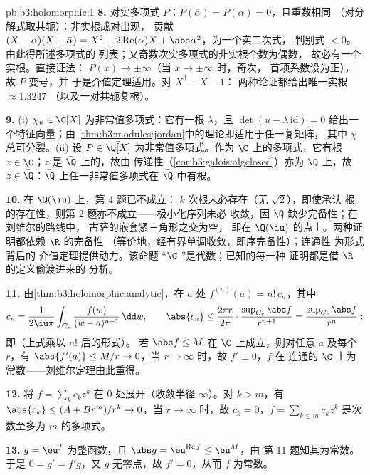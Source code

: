 \begin{solution}{pb:b3:holomorphic:1}
\textbf{8.} 对实多项式 $P$：$P(\bar\alpha) =
\overline{P(\alpha)} = 0$，且重数相同
（对分解式取共轭）：非实根成对出现，
贡献 $(X - \alpha)(X - \bar\alpha) = X^2 -
2\operatorname{Re}(\alpha)X + \abs\alpha^2$，为一个实二次式，
判别式 $< 0$。由此得所述多项式的
列表；又奇数次实多项式的非实根个数为偶数，
故必有一个实根。直接证法：
$P(x) \to \pm\infty$（当 $x \to \pm\infty$ 时，奇次，
首项系数设为正），故 $P$ 变号，并
于是介值定理适用。对 $X^3 - X - 1$：
两种论证都给出唯一实根 $\approx 1.3247$
（以及一对共轭复根）。

\textbf{9.} (i) $\chi_u \in \C[X]$ 为非常值多项式：它有一根
$\lambda$，且 $\det(u - \lambda\,\mathrm{id}) = 0$
给出一个特征向量；由
\cref{thm:b3:modules:jordan}中的理论即适用于任一复矩阵，
其中 $\chi$ 总可分裂。(ii) 设 $P \in \bar\Q[X]$
为非常值多项式。作为 $\C$ 上的多项式，它有根 $z
\in \C$；$z$ 是 $\bar\Q$ 上的，故由
传递性（\cref{cor:b3:galois:algclosed}）亦为 $\Q$ 上，故 $z \in
\bar\Q$：$\bar\Q$ 上任一非常值多项式在
$\bar\Q$ 中有根。

\textbf{10.} 在 $\Q(\iu)$ 上，第 4 题已不成立：
$k$ 次根未必存在（无 $\sqrt2$），即使承认
根的存在性，则第 2 题亦不成立——极小化序列未必
收敛，因 $\Q$ 缺少完备性；在刘维尔的路线中，
古萨的嵌套紧三角形之交为空，
即在 $\Q(\iu)$ 的点上。两种证明都依赖 $\R$ 的完备性
（等价地，经有界单调收敛，即序完备性）；连通性
为形式背后的
介值定理提供动力。该命题
“$\C$ ”是代数；已知的每一种
证明都是借 $\R$ 的定义偷渡进来的
分析。

\textbf{11.} 由\cref{thm:b3:holomorphic:analytic}，在 $a$ 处
$f^{(n)}(a) = n!\,c_n$，其中
\[
c_n = \frac1{2\iu\pi}\int_{C_r}\frac{f(w)}{(w -
a)^{n+1}}\,\dd w,
\qquad
\abs{c_n} \leq \frac{2\pi r}{2\pi}\cdot
\frac{\sup_{C_r}\abs f}{r^{n+1}}
= \frac{\sup_{C_r}\abs f}{r^{n}} :
\]
即（上式乘以 $n!$ 后的形式）。
若 $\abs f \leq M$ 在 $\C$ 上成立，则对任意
$a$ 及每个 $r$，有 $\abs{f'(a)} \leq M/r \to 0$，当 $r \to
\infty$ 时，故 $f' \equiv 0$，$f$ 在
连通的 $\C$ 上为常数——刘维尔定理由此重得。

\textbf{12.} 将 $f = \sum_kc_kz^k$ 在 $0$ 处展开（收敛半径
$\infty$）。对 $k > m$，有 $\abs{c_k} \leq (A + Br^m)/r^k \to
0$，当 $r \to \infty$ 时，故 $c_k = 0$，$f =
\sum_{k\leq m}c_kz^k$ 是次数至多为 $m$ 的多项式。

\textbf{13.} $g = \eu^f$ 为整函数，且 $\abs g =
\eu^{\operatorname{Re}f} \leq \eu^M$，由
第 11 题知其为常数。于是 $0 = g' = f'g$，又 $g$ 无零点，故 $f' = 0$，从而 $f$
为常数。


\end{solution}
